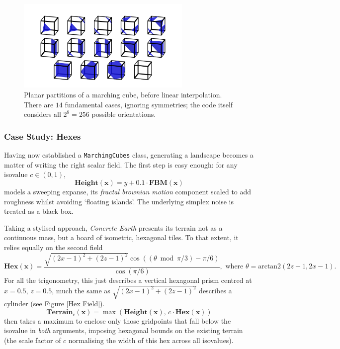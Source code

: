 \documentclass[a4paper, 11pt]{article}
\begin{document}
\begin{flushleft}
\vspace{5pt}\noindent
\begin{figure}[h]
\centering
\includegraphics[width=0.75\textwidth]{Marching Cube Partitions}
\caption{Planar partitions of a marching cube, before linear interpolation. There are $14$ fundamental cases, ignoring symmetries; the code itself considers all $2^8 = 256$ possible orientations.}
\label{Marching Cube Partitions}
\end{figure}

\newpage
\subsubsection{Case Study: Hexes}

Having now established a \texttt{MarchingCubes} class, generating a landscape becomes a matter of writing the right scalar field. The first step is easy enough: for any isovalue $c \in \left(0,1\right)$,
$$\textbf{Height}(\mathbf{x}) = y + 0.1\cdot\textbf{FBM}(\mathbf{x})$$
models a sweeping expanse, its \textit{fractal brownian motion} component scaled to add roughness whilst avoiding `floating islands'. The underlying simplex noise is treated as a black box.

\vspace{5pt}\noindent
Taking a stylised approach, \textit{Concrete Earth} presents its terrain not as a continuous mass, but a board of isometric, hexagonal tiles. To that extent, it relies equally on the second field
$$\textbf{Hex}(\mathbf{x}) = \frac{\sqrt{(2x-1)^2+(2z-1)^2}\cos\left((\theta\bmod\pi/3)-\pi/6\right)}{\cos\left(\pi/6\right)}, \,\, \textrm{where} \,\, \theta = \textrm{arctan2}\left(2z-1, 2x-1\right).$$
For all the trigonometry, this just describes a vertical hexagonal prism centred at $x = 0.5$, $z = 0.5$, much the same as $\sqrt{(2x-1)^2+(2z-1)^2}$ describes a cylinder (see Figure \ref{Hex Field}).
$$\textbf{Terrain}_c(\mathbf{x}) = \max\left(\textbf{Height}(\mathbf{x}), \, c\cdot\textbf{Hex}(\mathbf{x})\right)$$
then takes a maximum to enclose only those gridpoints that fall below the isovalue in \textit{both} arguments, imposing hexagonal bounds on the existing terrain (the scale factor of $c$ normalising the width of this hex across all isovalues). 


\end{flushleft}
\end{document}
